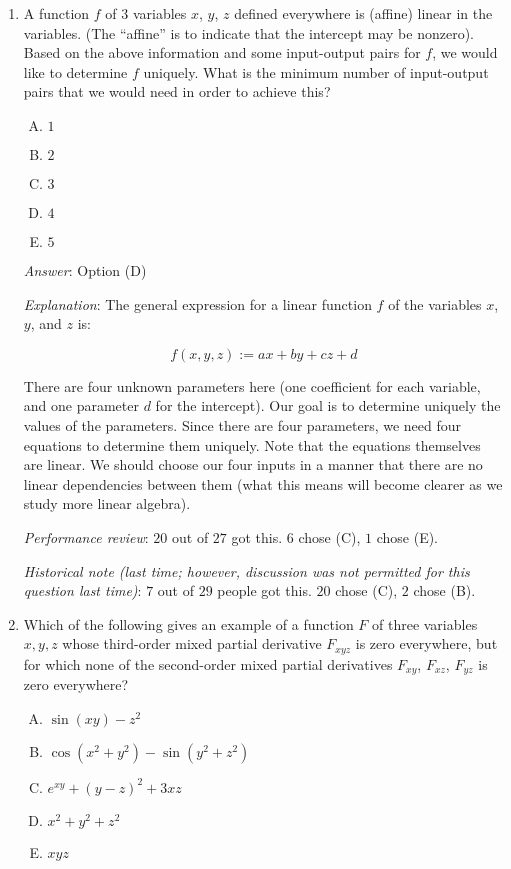 \documentclass[10pt]{amsart}
\begin{document}
\begin{enumerate}
\item A function $f$ of $3$ variables $x$, $y$, $z$ defined everywhere is
  (affine) linear in the variables. (The ``affine'' is to indicate
  that the intercept may be nonzero). Based on the above information
  and some input-output pairs for $f$, we would like to determine $f$
  uniquely. What is the minimum number of input-output pairs that we
  would need in order to achieve this?

  \begin{enumerate}[(A)]
  \item $1$
  \item $2$
  \item $3$
  \item $4$
  \item $5$
  \end{enumerate}

  {\em Answer}: Option (D)

  {\em Explanation}: The general expression for a linear function $f$
  of the variables $x$, $y$, and $z$ is:

  $$f(x,y,z) := ax + by + cz + d$$

  There are four unknown parameters here (one coefficient for each
  variable, and one parameter $d$ for the intercept). Our goal is to
  determine uniquely the values of the parameters. Since there are
  four parameters, we need four equations to determine them
  uniquely. Note that the equations themselves are linear. We should
  choose our four inputs in a manner that there are no linear
  dependencies between them (what this means will become clearer as we
  study more linear algebra).

  {\em Performance review}: $20$ out of $27$ got this. $6$ chose (C),
  $1$ chose (E).

  {\em Historical note (last time; however, discussion was not
    permitted for this question last time)}: $7$ out of $29$ people
  got this. $20$ chose (C), $2$ chose (B).

\item Which of the following gives an example of a function $F$ of
  three variables $x,y,z$ whose third-order mixed partial derivative
  $F_{xyz}$ is zero everywhere, but for which none of the second-order
  mixed partial derivatives $F_{xy}$, $F_{xz}$, $F_{yz}$ is zero
  everywhere?

  \begin{enumerate}[(A)]
  \item $\sin(xy) - z^2$
  \item $\cos(x^2 + y^2) - \sin(y^2 + z^2)$
  \item $e^{xy} + (y - z)^2 + 3xz$
  \item $x^2 + y^2 + z^2$
  \item $xyz$
  \end{enumerate}


\end{enumerate}
\end{document}
